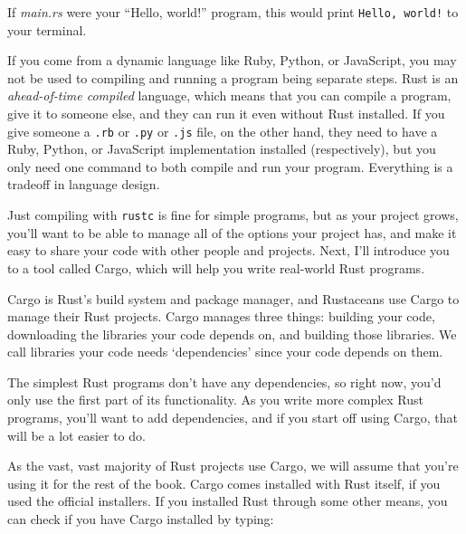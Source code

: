 \documentclass[a4paper,]{book}
\newenvironment{Shaded}{\begin{snugshade}}{\end{snugshade}}
\newcommand{\KeywordTok}[1]{\textcolor[rgb]{0.13,0.29,0.53}{\textbf{{#1}}}}
\newcommand{\CommentTok}[1]{\textcolor[rgb]{0.56,0.35,0.01}{\textit{{#1}}}}
\newcommand{\NormalTok}[1]{{#1}}
\begin{document}
\begin{Shaded}
\end{Shaded}

If \emph{main.rs} were your ``Hello, world!'' program, this would print
\texttt{Hello,\ world!} to your terminal.

If you come from a dynamic language like Ruby, Python, or JavaScript,
you may not be used to compiling and running a program being separate
steps. Rust is an \emph{ahead-of-time compiled} language, which means
that you can compile a program, give it to someone else, and they can
run it even without Rust installed. If you give someone a \texttt{.rb}
or \texttt{.py} or \texttt{.js} file, on the other hand, they need to
have a Ruby, Python, or JavaScript implementation installed
(respectively), but you only need one command to both compile and run
your program. Everything is a tradeoff in language design.

Just compiling with \texttt{rustc} is fine for simple programs, but as
your project grows, you'll want to be able to manage all of the options
your project has, and make it easy to share your code with other people
and projects. Next, I'll introduce you to a tool called Cargo, which
will help you write real-world Rust programs.


Cargo is Rust's build system and package manager, and Rustaceans use
Cargo to manage their Rust projects. Cargo manages three things:
building your code, downloading the libraries your code depends on, and
building those libraries. We call libraries your code needs
`dependencies' since your code depends on them.

The simplest Rust programs don't have any dependencies, so right now,
you'd only use the first part of its functionality. As you write more
complex Rust programs, you'll want to add dependencies, and if you start
off using Cargo, that will be a lot easier to do.

As the vast, vast majority of Rust projects use Cargo, we will assume
that you're using it for the rest of the book. Cargo comes installed
with Rust itself, if you used the official installers. If you installed
Rust through some other means, you can check if you have Cargo installed
by typing:
\end{document}
